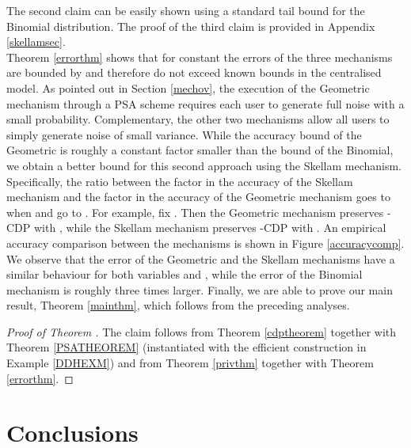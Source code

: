 \documentclass[10pt]{extarticle}
\begin{document}
The second claim can be easily shown using a standard tail bound for the Binomial distribution. The proof of the third claim is provided in Appendix \ref{skellamsec}.\\
Theorem \ref{errorthm} shows that for constant  the errors of the three mechanisms are bounded by  and therefore do not exceed known bounds in the centralised model. As pointed out in Section \ref{mechov}, the execution of the Geometric mechanism through a PSA scheme requires each user to generate full noise with a small probability. Complementary, the other two mechanisms allow all users to simply generate noise of small variance. While the accuracy bound of the Geometric is roughly a constant factor smaller than the bound of the Binomial, we obtain a better bound for this second approach using the Skellam mechanism. Specifically, the ratio between the factor  in the accuracy of the Skellam mechanism and the factor  in the accuracy of the Geometric mechanism goes to  when  and  go to . For example, fix . Then the Geometric mechanism preserves -\mbox{\upshape\sffamily CDP} with , while the Skellam mechanism preserves -\mbox{\upshape\sffamily CDP} with . An empirical accuracy comparison between the mechanisms is shown in Figure \ref{accuracycomp}. We observe that the error of the Geometric and the Skellam mechanisms have a similar behaviour for both variables  and , while the error of the Binomial mechanism is roughly three times larger. Finally, we are able to prove our main result, Theorem \ref{mainthm}, which follows from the preceding analyses.

\begin{proof}[Proof of Theorem ] The claim follows from Theorem \ref{cdptheorem} together with Theorem \ref{PSATHEOREM} (instantiated with the efficient construction in Example \ref{DDHEXM}) and from Theorem \ref{privthm} together with Theorem \ref{errorthm}.
\end{proof}


\section{Conclusions}
\end{document}
